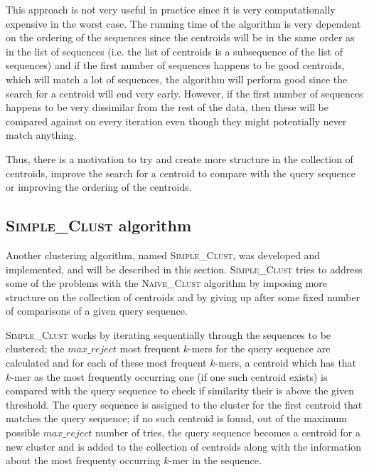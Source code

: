 
This approach is not very useful in practice since it is very computationally
expensive in the worst case. The running time of the algorithm is very
dependent on the ordering of the sequences since the centroids will be in the
same order as in the list of sequences (i.e. the list of centroids is a
subsequence of the list of sequences) and if the first number of sequences
happens to be good centroids, which will match a lot of sequences, the
algorithm will perform good since the search for a centroid will end very
early. However, if the first number of sequences happens to be very dissimilar
from the rest of the data, then these will be compared against on every
iteration even though they might potentially never match anything.

Thus, there is a motivation to try and create more structure in the collection
of centroids, improve the search for a centroid to compare with the query
sequence or improving the ordering of the centroids.




\subsection{\textsc{Simple\_Clust} algorithm}

Another clustering algorithm, named \textsc{Simple\_Clust}, was developed and
implemented, and will be described in this section. \textsc{Simple\_Clust}
tries to address some of the problems with the \textsc{Naive\_Clust} algorithm
by imposing more structure on the collection of centroids and by giving up
after some fixed number of comparisons of a given query sequence.


\textsc{Simple\_Clust} works by iterating sequentially through the sequences to
be clustered; the $max\_reject$ most frequent $k$-mers for the query sequence
are calculated and for each of these most frequent $k$-mers, a centroid which
has that $k$-mer as the most frequently occurring one (if one such centroid
exists) is compared with the query sequence to check if similarity their is
above the given threshold. The query sequence is assigned to the cluster for
the first centroid that matches the query sequence; if no such centroid is
found, out of the maximum possible $max\_reject$ number of tries, the query
sequence becomes a centroid for a new cluster and is added to the collection of
centroids along with the information about the most frequenty occurring $k$-mer
in the sequence.  %

